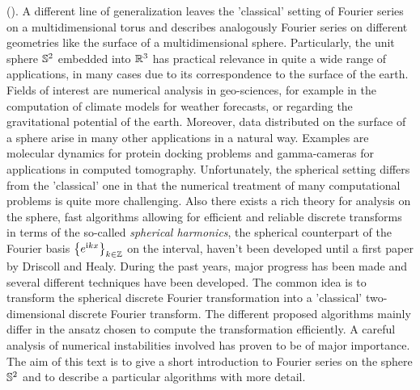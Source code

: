 (\cite{kupo02C}).
A different line of generalization leaves the 'classical' setting of 
Fourier series on a multidimensional torus and describes analogously
Fourier series on different geometries like the surface of a
multidimensional sphere. Particularly, the unit sphere $\mathbb{S}^2$ 
embedded into $\mathbb{R}^3$ has practical relevance in quite a wide range of 
applications, in many cases due to its correspondence to the surface 
of the earth. Fields of interest are numerical analysis in
geo-sciences, for example in the computation of climate models for
weather forecasts, or regarding the gravitational potential of the 
earth. Moreover, data distributed on the surface of a sphere arise
in many other applications in a natural way. Examples are
molecular dynamics for protein docking problems and 
gamma-cameras for applications in computed tomography.
Unfortunately, the spherical setting differs from the 'classical' 
one in that the numerical treatment of many computational problems
is quite more challenging. Also there exists a rich theory for 
analysis on the sphere, fast algorithms allowing for efficient and
reliable discrete transforms in terms of the so-called 
\emph{spherical harmonics}, the spherical counterpart of the 
Fourier basis $\left\{e^{\mbox{\scriptsize\rm{i}} k x}\right\rbrace_{k \in \mathbb{Z}}$ on the interval,
haven't been developed until a first paper by Driscoll and Healy. 
During the past years, major progress has been made and several 
different techniques have been developed. The common idea is to
transform the spherical discrete Fourier transformation into a
'classical' two-dimensional discrete Fourier transform. The
different proposed algorithms mainly differ in the ansatz chosen
to compute the transformation efficiently. A careful analysis
of numerical instabilities involved has proven to be of major 
importance.
The aim of this text is to give a short introduction to Fourier 
series on the sphere $\mathbb{S}^2$ and to describe a particular
algorithms with more detail. 